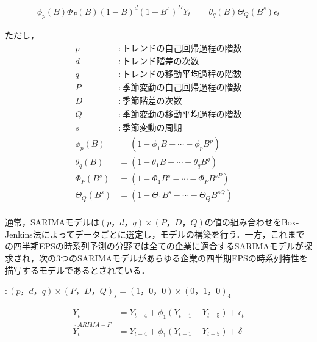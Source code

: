 \documentclass[a4paper，12pt]{jsarticle}
\begin{document}
\begin{equation}
  \begin{split}
    \phi_p(B)\Phi_{P}(B)(1-B)^d(1-B^s)^DY_t &= \theta_q(B)\Theta_Q(B^s)\epsilon_t
  \end{split}
\end{equation}

ただし，
\begin{equation}
  \begin{split}
    p &: トレンドの自己回帰過程の階数 \\
    d &: トレンド階差の次数 \\
    q &: トレンドの移動平均過程の階数 \\
    P &: 季節変動の自己回帰過程の階数 \\
    D &: 季節階差の次数 \\
    Q &: 季節変動の移動平均過程の階数 \\
    s &: 季節変動の周期 \\
    \phi_p(B) &= (1 - \phi_1B - \cdots - \phi_pB^p) \\
    \theta_q(B) &= (1 - \theta_1B - \cdots - \theta_qB^q) \\
    \Phi_P(B^s) &= (1 - \Phi_1B^s - \cdots - \Phi_PB^{sP}) \\
    \Theta_Q(B^s) &= (1 - \Theta_1B^s - \cdots - \Theta_QB^{sQ}) \\
  \end{split}
\end{equation}

通常，SARIMAモデルは$(p，d，q) \times (P，D，Q)$の値の組み合わせをBox-Jenkins法によってデータごとに選定し，モデルの構築を行う．一方，これまでの四半期EPSの時系列予測の分野では全ての企業に適合するSARIMAモデルが探求され，次の3つのSARIMAモデル\citep*{foster1977quarterly, griffin1977time, brown1979univariate}があらゆる企業の四半期EPSの時系列特性を描写するモデルであるとされている．

\cite{foster1977quarterly} $: (p，d，q) \times (P，D，Q)_s = (1，0，0) \times (0，1，0)_4$

\begin{equation}
  \begin{split}
    Y_t &= Y_{t-4} + \phi_1(Y_{t-1} - Y_{t-5}) + \epsilon_t \\
    \hat{Y}_t^{ARIMA-F} &= Y_{t-4} + \phi_1(Y_{t-1} - Y_{t-5}) + \delta \\
  \end{split}
\end{equation}
\end{document}
